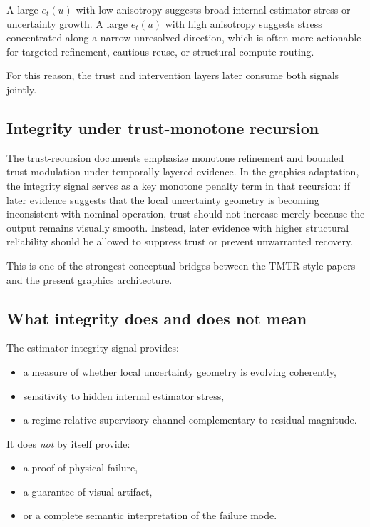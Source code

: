 \documentclass[11pt]{article}
\theoremstyle{definition}
\theoremstyle{plain}
\begin{document}
A large $e_t(u)$ with low anisotropy suggests broad internal estimator stress or uncertainty growth. A large $e_t(u)$ with high anisotropy suggests stress concentrated along a narrow unresolved direction, which is often more actionable for targeted refinement, cautious reuse, or structural compute routing.

For this reason, the trust and intervention layers later consume both signals jointly.


\subsection{Integrity under trust-monotone recursion}

The trust-recursion documents emphasize monotone refinement and bounded trust modulation under temporally layered evidence. In the graphics adaptation, the integrity signal serves as a key monotone penalty term in that recursion: if later evidence suggests that the local uncertainty geometry is becoming inconsistent with nominal operation, trust should not increase merely because the output remains visually smooth. Instead, later evidence with higher structural reliability should be allowed to suppress trust or prevent unwarranted recovery.

This is one of the strongest conceptual bridges between the TMTR-style papers and the present graphics architecture. 


\subsection{What integrity does and does not mean}

The estimator integrity signal provides:
\begin{itemize}[leftmargin=1.5em]
    \item a measure of whether local uncertainty geometry is evolving coherently,
    \item sensitivity to hidden internal estimator stress,
    \item a regime-relative supervisory channel complementary to residual magnitude.
\end{itemize}

It does \emph{not} by itself provide:
\begin{itemize}[leftmargin=1.5em]
    \item a proof of physical failure,
    \item a guarantee of visual artifact,
    \item or a complete semantic interpretation of the failure mode.
\end{itemize}
\end{document}
